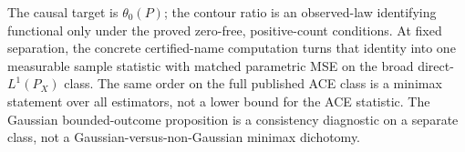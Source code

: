 The causal target is \(\theta_0(P)\); the contour ratio is an observed-law identifying functional only under the proved zero-free, positive-count conditions.  At fixed separation, the concrete certified-name computation turns that identity into one measurable sample statistic with matched parametric MSE on the broad direct-\(L^1(P_X)\) class.  The same order on the full published ACE class is a minimax statement over all estimators, not a lower bound for the ACE statistic.  The Gaussian bounded-outcome proposition is a consistency diagnostic on a separate class, not a Gaussian-versus-non-Gaussian minimax dichotomy.